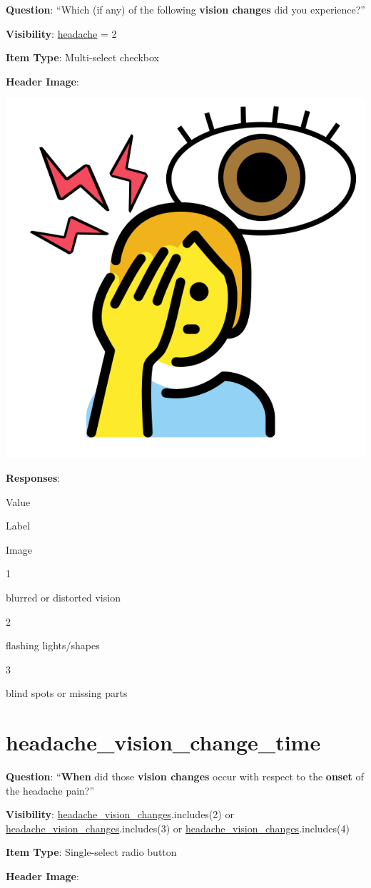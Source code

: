 \documentclass[]{book}
\begin{document}
\textbf{Question}: ``Which (if any) of the following \textbf{vision changes} did you experience?''

\textbf{Visibility}: \protect\hyperlink{headache}{headache} = 2

\textbf{Item Type}: Multi-select checkbox

\textbf{Header Image}:

\begin{flushleft}\includegraphics[width=0.33\linewidth]{downloadFigs4latex_NIMH_Applet_Codebook/headache_vision_changes_headerImg} \end{flushleft}

\textbf{Responses}:

Value

Label

Image

1

blurred or distorted vision

2

flashing lights/shapes

3

blind spots or missing parts

\hypertarget{headache_vision_change_time}{%
\section{headache\_vision\_change\_time}\label{headache_vision_change_time}}

\textbf{Question}: ``\textbf{When} did those \textbf{vision changes} occur with respect to the \textbf{onset} of the headache pain?''

\textbf{Visibility}: \protect\hyperlink{headache_vision_changes}{headache\_vision\_changes}.includes(2) or \protect\hyperlink{headache_vision_changes}{headache\_vision\_changes}.includes(3) or \protect\hyperlink{headache_vision_changes}{headache\_vision\_changes}.includes(4)

\textbf{Item Type}: Single-select radio button

\textbf{Header Image}:
\end{document}
